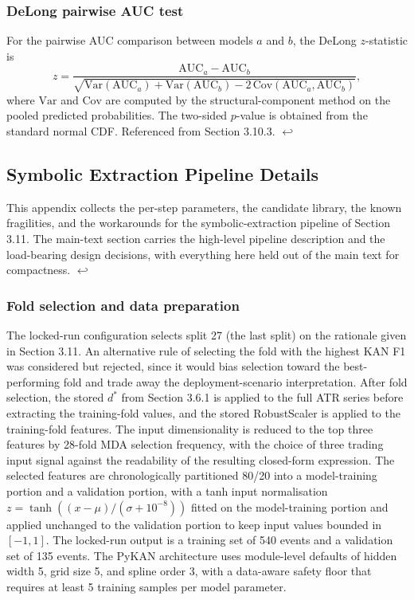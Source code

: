 \documentclass[12pt,a4paper,oneside]{article}
\begin{document}
\subsubsection{DeLong pairwise AUC test}\label{app:delong_formula}
For the pairwise AUC comparison between models $a$ and $b$, the DeLong $z$-statistic \citep{delong_1988} is
\[
z = \frac{\text{AUC}_a - \text{AUC}_b}{\sqrt{\text{Var}(\text{AUC}_a) + \text{Var}(\text{AUC}_b) - 2 \, \text{Cov}(\text{AUC}_a, \text{AUC}_b)}},
\]
where $\text{Var}$ and $\text{Cov}$ are computed by the structural-component method on the pooled predicted probabilities. The two-sided $p$-value is obtained from the standard normal CDF. Referenced from Section 3.10.3. \hyperref[ref:delong_formula_call]{$\hookleftarrow$}


\subsection{Symbolic Extraction Pipeline Details}\label{app:symbolic_details}

This appendix collects the per-step parameters, the candidate library, the known fragilities, and the workarounds for the symbolic-extraction pipeline of Section 3.11. The main-text section carries the high-level pipeline description and the load-bearing design decisions, with everything here held out of the main text for compactness. \hyperref[ref:symbolic_appendix_call]{$\hookleftarrow$}


\subsubsection{Fold selection and data preparation}\label{app:symbolic_fold_setup}

The locked-run configuration selects split 27 (the last split) on the rationale given in Section 3.11. An alternative rule of selecting the fold with the highest KAN F1 was considered but rejected, since it would bias selection toward the best-performing fold and trade away the deployment-scenario interpretation. After fold selection, the stored $d^{\ast}$ from Section 3.6.1 is applied to the full ATR series before extracting the training-fold values, and the stored RobustScaler is applied to the training-fold features. The input dimensionality is reduced to the top three features by 28-fold MDA selection frequency, with the choice of three trading input signal against the readability of the resulting closed-form expression. The selected features are chronologically partitioned 80/20 into a model-training portion and a validation portion, with a tanh input normalisation $z = \tanh((x - \mu) / (\sigma + 10^{-8}))$ fitted on the model-training portion and applied unchanged to the validation portion to keep input values bounded in $[-1, 1]$. The locked-run output is a training set of 540 events and a validation set of 135 events. The PyKAN architecture uses module-level defaults of hidden width 5, grid size 5, and spline order 3, with a data-aware safety floor that requires at least 5 training samples per model parameter.
\end{document}
